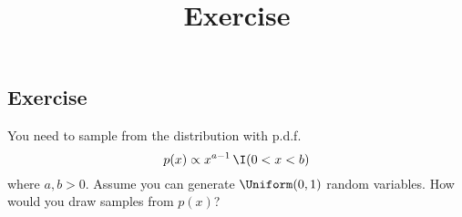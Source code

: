 \documentclass[12pt]{article}
\title{Exercise}
\author{}
\date{}
\begin{document}
\maketitle


\subsection*{Exercise}
You need to sample from the distribution with p.d.f.\ 
$$p(x) \propto x^{a-1}\,\I(0<x<b)$$
where $a,b>0$.
Assume you can generate $\Uniform(0,1)$ random variables. 
How would you draw samples from $p(x)$?
\end{document}

